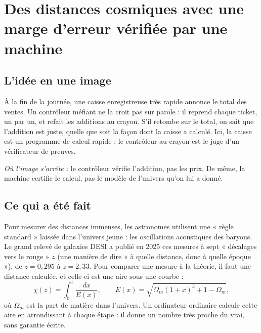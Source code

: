 \chapter[Des distances cosmiques vérifiées]{Des distances cosmiques avec une marge d'erreur vérifiée par une machine}

\section*{L'idée en une image}

\begin{analogie}
À la fin de la journée, une caisse enregistreuse très rapide annonce le total des ventes. Un contrôleur méfiant ne
la croit pas sur parole : il reprend chaque ticket, un par un, et refait les additions au crayon. S'il retombe sur le
total, on sait que l'addition est juste, quelle que soit la façon dont la caisse a calculé. Ici, la caisse est un
programme de calcul rapide ; le contrôleur au crayon est le juge d'un vérificateur de preuves.

\emph{Où l'image s'arrête :} le contrôleur vérifie l'addition, pas les prix. De même, la machine certifie le calcul,
pas le modèle de l'univers qu'on lui a donné.
\end{analogie}

\section*{Ce qui a été fait}

Pour mesurer des distances immenses, les astronomes utilisent une « règle standard » laissée dans l'univers jeune : les
oscillations acoustiques des baryons. Le grand relevé de galaxies DESI a publié en 2025 ces mesures à sept
« décalages vers le rouge » $z$ (une manière de dire « à quelle distance, donc à quelle époque »), de $z=0{,}295$ à
$z=2{,}33$. Pour comparer une mesure à la théorie, il faut une distance calculée, et celle-ci est une aire sous une
courbe :
\[ \chi(z)=\int_0^z \frac{dx}{E(x)}, \qquad E(x)=\sqrt{\Omega_m(1+x)^3+1-\Omega_m}, \]
où $\Omega_m$ est la part de matière dans l'univers. Un ordinateur ordinaire calcule cette aire en arrondissant à
chaque étape : il donne un nombre très proche du vrai, sans garantie écrite.

